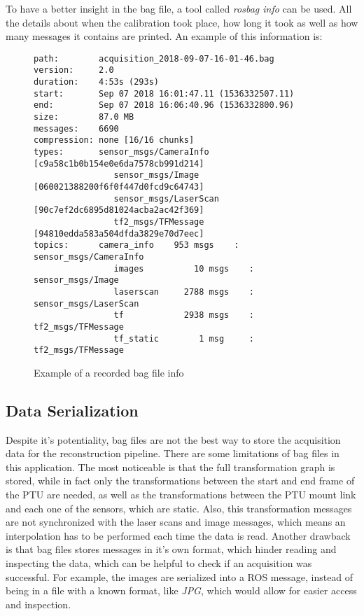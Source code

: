 To have a better insight in the bag file, a tool called \emph{rosbag info} can be used. All the details about when the calibration took place, how long it took as well as how many messages it contains are printed. An example of this information is:

\begin{figure}
    
    \begin{Verbatim}
path:        acquisition_2018-09-07-16-01-46.bag
version:     2.0
duration:    4:53s (293s)
start:       Sep 07 2018 16:01:47.11 (1536332507.11)
end:         Sep 07 2018 16:06:40.96 (1536332800.96)
size:        87.0 MB
messages:    6690
compression: none [16/16 chunks]
types:       sensor_msgs/CameraInfo [c9a58c1b0b154e0e6da7578cb991d214]
                sensor_msgs/Image      [060021388200f6f0f447d0fcd9c64743]
                sensor_msgs/LaserScan  [90c7ef2dc6895d81024acba2ac42f369]
                tf2_msgs/TFMessage     [94810edda583a504dfda3829e70d7eec]
topics:      camera_info    953 msgs    : sensor_msgs/CameraInfo
                images          10 msgs    : sensor_msgs/Image     
                laserscan     2788 msgs    : sensor_msgs/LaserScan 
                tf            2938 msgs    : tf2_msgs/TFMessage    
                tf_static        1 msg     : tf2_msgs/TFMessage
    \end{Verbatim}

    \caption{Example of a recorded bag file info}
    \label{figure:bag-file-example}
\end{figure}

\subsection{Data Serialization}
 
Despite it's potentiality, bag files are not the best way to store the acquisition data for the reconstruction pipeline. There are some limitations of bag files in this application. The most noticeable is that the full transformation graph is stored, while in fact only the transformations between the start and end frame of the PTU are needed, as well as the transformations between the PTU mount link and each one of the sensors, which are static. Also, this transformation messages are not synchronized with the laser scans and image messages, which means an interpolation has to be performed each time the data is read. Another drawback is that bag files stores messages in it's own format, which hinder reading and inspecting the data, which can be helpful to check if an acquisition was successful. For example, the images are serialized into a ROS message, instead of being in a file with a known format, like \emph{JPG}, which would allow for easier access and inspection.

